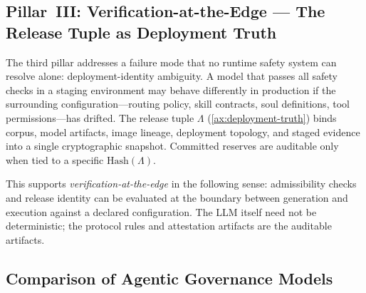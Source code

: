 \documentclass[11pt]{article}
\theoremstyle{remark}
\begin{document}
\subsection[Pillar~III: Verification-at-the-Edge]{Pillar~III: Verification-at-the-Edge --- The Release Tuple as Deployment Truth}

The third pillar addresses a failure mode that no runtime safety system can resolve alone: deployment-identity ambiguity. A model that passes all safety checks in a staging environment may behave differently in production if the surrounding configuration---routing policy, skill contracts, soul definitions, tool permissions---has drifted. The release tuple $\Lambda$ (\cref{ax:deployment-truth}) binds corpus, model artifacts, image lineage, deployment topology, and staged evidence into a single cryptographic snapshot. Committed reserves are auditable only when tied to a specific $\mathrm{Hash}(\Lambda)$.

This supports \emph{verification-at-the-edge} in the following sense: admissibility checks and release identity can be evaluated at the boundary between generation and execution against a declared configuration. The LLM itself need not be deterministic; the protocol rules and attestation artifacts are the auditable artifacts.

\subsection{Comparison of Agentic Governance Models}
\end{document}
